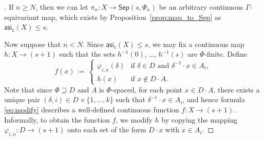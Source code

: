 \documentclass[11pt,reqno,psamsfonts]{amsart}
\theoremstyle{bfnote}
\theoremstyle{definition}
\theoremstyle{remark}
\newcommand{\0}{\varnothing}
\newcommand{\set}[1]{\{#1\}}
\renewcommand{\phi}{\varphi}
\renewcommand{\leq}{\leqslant}
\renewcommand{\geq}{\geqslant}
\newcommand{\defeq}{\coloneqq}
\newcommand{\emphd}[1]{{\fontseries{b}\selectfont\textsf{#1}}}
\newcommand{\G}{\Gamma}
\newcommand{\asi}{\mathsf{asi}}
\newcommand{\casi}{\asi_{\mathsf{c}}}
\newcommand{\iden}{\mathbf{1}}
\newcommand{\Sep}{\mathsf{Sep}}
\numberwithin{equation}{section}
\newenvironment{scproof}[1][]{\begin{proof}[\textsc{\upshape{Proof}}#1]}{\end{proof}}
\begin{document}
\begin{scproof}
        If $n \geq N$, then %
        we can let $\pi_n \colon X \to \Sep(s,\Phi_n)$ be an arbitrary continuous $\G$-equivariant map, which exists by Proposition~\ref{prop:map_to_Sep} as $\casi(X) \leq s$.
            
            Now suppose that $n < N$. %
            Since $\casi(X) \leq s$, we may fix a continuous map $h \colon X \to (s+1)$ such that the sets $h^{-1}(0)$, \ldots, $h^{-1}(s)$ are $\Phi$-finite. %
            Define
            \begin{equation}\label{eq:modify}
                f(x) \,\defeq\, \begin{cases}
                    \phi_{i,n}(\delta) &\text{if $\delta \in D$ and $\delta^{-1}\cdot x \in A_i$},\\
                    h(x) &\text{if $x \notin D \cdot A$}.
                \end{cases}
            \end{equation}
            Note that since $\Phi \supseteq D$ and $A$ is $\Phi$-spaced, for each point $x \in D \cdot A$, there exists a unique pair $(\delta,i) \in D \times \set{1, \ldots, k}$ such that $\delta^{-1}\cdot x \in A_i$, and hence formula \eqref{eq:modify} describes a well-defined continuous function $f \colon X \to (s+1)$. Informally, to obtain the function $f$, we modify $h$ by copying the mapping $\phi_{i,n} \colon D \to (s+1)$ onto each set of the form $D \cdot x$ with $x \in A_i$.
            

\end{scproof}
\end{document}
